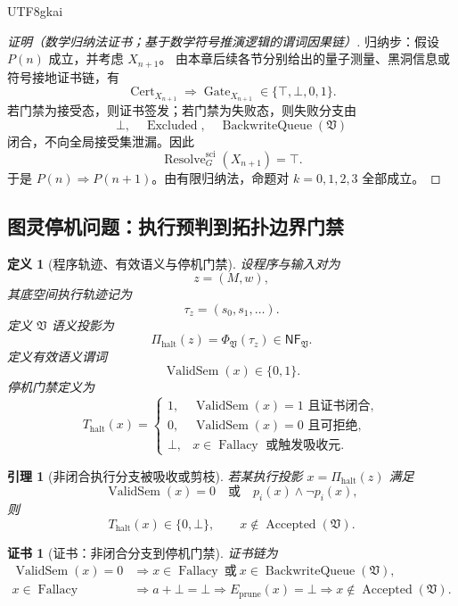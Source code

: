 \documentclass[12pt]{article}
\newtheorem{definition}{定义}[section]
\newtheorem{lemma}{引理}[section]
\newtheorem{Certificate}{证书}[section]
\newcommand{\Vsys}{\mathfrak V}
\newcommand{\NF}{\mathsf{NF}}
\DeclareMathOperator{\Cert}{Cert}
\DeclareMathOperator{\Accepted}{Accepted}
\DeclareMathOperator{\Fallacy}{Fallacy}
\DeclareMathOperator{\Resolve}{Resolve}
\DeclareMathOperator{\Gate}{Gate}
\DeclareMathOperator{\BackwriteQueue}{BackwriteQueue}
\DeclareMathOperator{\ValidSem}{ValidSem}
\DeclareMathOperator{\Excluded}{Excluded}
\begin{document}
\begin{CJK*}{UTF8}{gkai}
\begin{proof}[证明（数学归纳法证书；基于数学符号推演逻辑的谓词因果链）]
归纳步：假设 \(P(n)\) 成立，并考虑 \(X_{n+1}\)。
由本章后续各节分别给出的量子测量、黑洞信息或符号接地证书链，有
\[
  \Cert_{X_{n+1}}
  \Rightarrow
  \Gate_{X_{n+1}}\in\{\top,\bot,0,1\}.
\]
若门禁为接受态，则证书签发；若门禁为失败态，则失败分支由
\[
  \bot,\quad \Excluded,\quad \BackwriteQueue(\Vsys)
\]
闭合，不向全局接受集泄漏。因此
\[
  \Resolve_G^{\mathrm{sci}}(X_{n+1})=\top.
\]
于是 \(P(n)\Rightarrow P(n+1)\)。由有限归纳法，命题对 \(k=0,1,2,3\) 全部成立。
\end{proof}

\subsection{图灵停机问题：执行预判到拓扑边界门禁}
\label{subsec:tex59-halting-gate}

\begin{definition}[程序轨迹、有效语义与停机门禁]
\label{def:tex59-halting-domain}
设程序与输入对为
\[
  z=(M,w),
\]
其底空间执行轨迹记为
\[
  \tau_z=(s_0,s_1,\ldots).
\]
定义 \(\Vsys\) 语义投影为
\[
  \Pi_{\mathrm{halt}}(z)
  =
  \Phi_{\Vsys}(\tau_z)
  \in\NF_{\Vsys}.
\]
定义有效语义谓词
\[
  \ValidSem(x)\in\{0,1\}.
\]
停机门禁定义为
\[
  T_{\mathrm{halt}}(x)
  =
  \begin{cases}
  1, & \ValidSem(x)=1\text{ 且证书闭合},\\
  0, & \ValidSem(x)=0\text{ 且可拒绝},\\
  \bot, & x\in\Fallacy\text{ 或触发吸收元}.
  \end{cases}
\]
\end{definition}

\begin{lemma}[非闭合执行分支被吸收或剪枝]
\label{lem:tex59-nonhalt-absorbed}
若某执行投影 \(x=\Pi_{\mathrm{halt}}(z)\) 满足
\[
  \ValidSem(x)=0
  \quad\text{或}\quad
  p_i(x)\wedge\neg p_i(x),
\]
则
\[
  T_{\mathrm{halt}}(x)\in\{0,\bot\},
  \qquad
  x\notin\Accepted(\Vsys).
\]
\end{lemma}

\begin{Certificate}[证书：非闭合分支到停机门禁]
\label{cert:tex59-nonhalt-absorbed}
证书链为
\[
  \begin{aligned}
  \ValidSem(x)=0
  &\Longrightarrow
  x\in\Fallacy\ \text{或}\ x\in\BackwriteQueue(\Vsys),\\
  x\in\Fallacy
  &\Longrightarrow
  a+\bot=\bot
  \Longrightarrow
  E_{\mathrm{prune}}(x)=\bot
  \Longrightarrow
  x\notin\Accepted(\Vsys).
  \end{aligned}
\]
\end{Certificate}


\end{CJK*}
\end{document}
